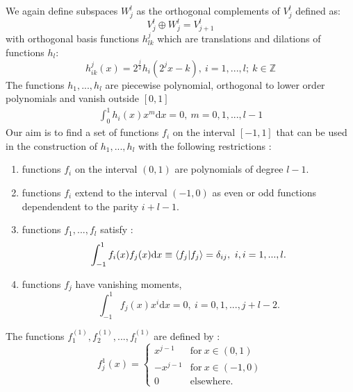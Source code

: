 \documentclass[../master_thesis.tex]{subfiles}
\begin{document}
We again define subspaces $W_j^l$ as the orthogonal complements of $V^l_j$
\cite{Alpert1993} defined as:
\begin{equation}
  V^l_j \oplus W_j^l = V^l_{j+1}
\end{equation}
 with orthogonal basis functions  $h^j_{lk}$ which are translations and dilations of functions $h_l$:
 \begin{equation}
   h^j_{ik}(x) = 2^\frac{j}{2}h_i(2^jx-k), \ i=1, ...,l;\ k \in \mathbb{Z}\label{eq:mwbasisfuncs}
 \end{equation}
 The functions $h_1, ...,h_l$ are piecewise polynomial, orthogonal to lower order polynomials and
 vanish outside $[0,1]$ \cite{Alpert1993}
\begin{align}
  \int_0^1h_i(x)x^m \text{d}x = 0,\ m = 0, 1, ..., l-1
\end{align}
Our aim is to find a set of functions $f_i$ on the interval $[-1,1]$ that can
be used in the construction of $h_1, ...,h_l$ with the following restrictions
\cite{Alpert1993, Beylkin:MRA}:
\begin{enumerate}
  \item functions $f_i$ on the interval $(0,1)$ are polynomials of degree $l-1.$
  \item functions $f_i$ extend to the interval $(-1, 0)$ as even or odd functions
  dependendent to the parity $i + l - 1$.
  \item functions $f_1,...,f_l$ satisfy : $$\int_{-1}^1f_i(x)f_j(x)\text{d}x \equiv \braket{f_j| f_j} = \delta_{ij}, \ i, i = 1, ..., l.$$
  \item functions $f_j$ have vanishing moments, $$\int_{-1}^1f_j(x)x^i\text{d}x = 0, \ i = 0, 1, ..., j+l-2.$$
\end{enumerate}
The functions $f^{(1)}_1, f^{(1)}_2, ..., f^{(1)}_l$ are defined by \cite{Alpert1993}:
\begin{equation}
  f^1_j(x) =
  \begin{cases}
  x^{j-1} & \text{for} \ x\in (0,1)\\
  -x^{j-1} & \text{for}\ x\in (-1, 0)\\
  0 & \text{elsewhere}.
\end{cases}
\end{equation}
\end{document}
